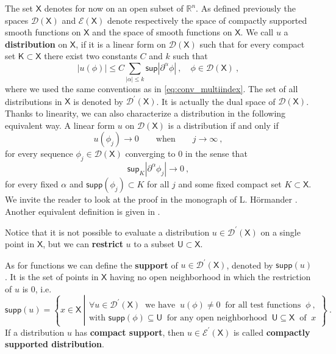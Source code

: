 \documentclass[11pt]{book}
\newcommand{\supp}{\mathsf{supp}}
\renewcommand{\sup}{\mathsf{sup}}
\newcommand{\abs}[1]{\left|#1\right|}
\newcommand{\Dcal}{\mathcal{D}}
\newcommand{\Ecal}{\mathcal{E}}
\newcommand{\Rbb}{\mathbb{R}}
\newcommand{\Ksf}{\mathsf{K}}
\newcommand{\Usf}{\mathsf{U}}
\newcommand{\Xsf}{\mathsf{X}}
\theoremstyle{break}
\begin{document}
The set $\Xsf$ denotes for now on an open subset of $\Rbb^n$. As defined previously the spaces $\Dcal(\Xsf)$ and $\Ecal(\Xsf)$ denote respectively the space of compactly supported smooth functions on $\Xsf$ and the space of smooth functions on $\Xsf$. We call $u$ a \textbf{distribution} on $\Xsf$, if it is a linear form on $\Dcal(\Xsf)$ such that for every compact set $\Ksf \subset \Xsf$ there exist two constants $C$ and $k$ such that
%
\begin{equation*}
\abs{u(\phi)} \leq C \sum_{\abs{\alpha} \leq k} \sup \abs{\partial^\alpha \phi} \ , \quad \phi \in \Dcal(\Xsf) \ ,
\end{equation*}
%
where we used the same conventions as in \eqref{eq:conv_multiindex}. The set of all distributions in $\Xsf$ is denoted by $\Dcal^\prime(\Xsf)$. It is actually the dual space of $\Dcal(\Xsf)$. Thanks to linearity, we can also characterize a distribution in the following equivalent way. A linear form $u$ on $\Dcal(\Xsf)$ is a distribution if and only if 
%
\begin{equation*}
u(\phi_j) \to 0 \qquad  \mbox{when} \qquad j \to \infty \ ,
\end{equation*}
%
for every sequence $\phi_j \in \Dcal(\Xsf)$ converging to $0$ in the sense that
%
\begin{equation*}
\sup_{K}\abs{\partial^\alpha\phi_j} \to 0 \ ,
\end{equation*}
%
for every fixed $\alpha$ and $\supp(\phi_j) \subset K$ for all $j$ and some fixed compact set $K \subset \Xsf$. We invite the reader to look at the proof in the monograph of L. Hörmander \cite[theorem 2.4]{hormander_analysis_1990}. Another equivalent definition is given in \cite[theorem 2.15]{hormander_analysis_1990}.


Notice that it is not possible to evaluate a distribution $u \in \Dcal^\prime(\Xsf)$ on a single point in $\Xsf$, but we can \textbf{restrict} $u$ to a subset $\Usf \subset \Xsf$. 


As for functions we can define the \textbf{support} of $u \in \Dcal^\prime(\Xsf)$, denoted by $\supp(u)$. It is the set of points in $\Xsf$ having no open neighborhood in which the restriction of $u$ is $0$, i.e. 
%
\begin{equation}
\supp(u) = \left\{ x \in \Xsf \ \left|
\begin{array}{l}
\forall u \in \Dcal^\prime(\Xsf) \ \mbox{ we have } \ u(\phi) \neq 0 \ \mbox{ for all test functions } \ \phi \ , \\ 
\mbox{with } \supp(\phi) \subseteq \Usf \ \mbox{ for any open neighborhood } \ \Usf \subseteq \Xsf \ \mbox{ of } \ x 
\end{array}
\right. \right\} \ .
\label{eq:supp_distribution}
\end{equation}
%
If a distribution $u$ has \textbf{compact support}, then $u \in \Ecal^\prime(\Xsf)$ is called \textbf{compactly supported distribution}. 
\end{document}
